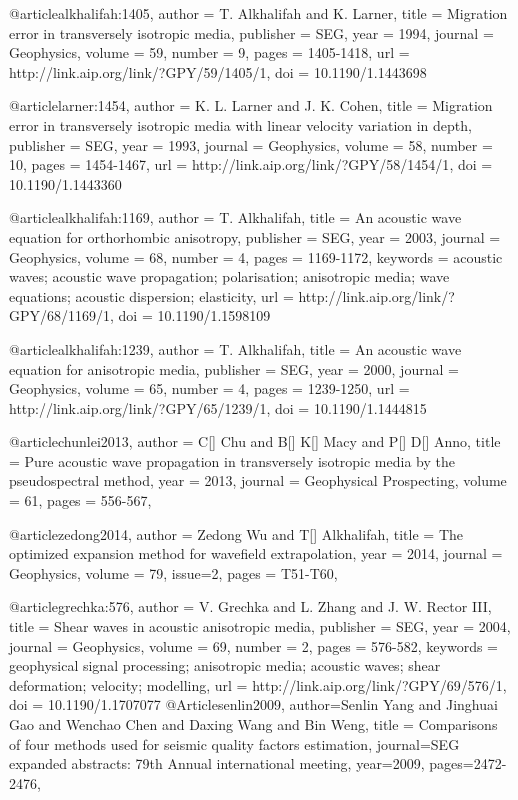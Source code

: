 {@article{alkhalifah:1405,
  author =	 {T. Alkhalifah and K. Larner},
  title =	 {Migration error in transversely isotropic media},
  publisher =	 {SEG},
  year =	 1994,
  journal =	 {Geophysics},
  volume =	 59,
  number =	 9,
  pages =	 {1405-1418},
  url =		 {http://link.aip.org/link/?GPY/59/1405/1},
  doi =		 {10.1190/1.1443698}
}

@article{larner:1454,
  author =	 {K. L. Larner and J. K. Cohen},
  title =	 {Migration error in transversely isotropic media with
                  linear velocity variation in depth},
  publisher =	 {SEG},
  year =	 1993,
  journal =	 {Geophysics},
  volume =	 58,
  number =	 10,
  pages =	 {1454-1467},
  url =		 {http://link.aip.org/link/?GPY/58/1454/1},
  doi =		 {10.1190/1.1443360}
}

@article{alkhalifah:1169,
  author =	 {T. Alkhalifah},
  title =	 {An acoustic wave equation for orthorhombic
                  anisotropy},
  publisher =	 {SEG},
  year =	 2003,
  journal =	 {Geophysics},
  volume =	 68,
  number =	 4,
  pages =	 {1169-1172},
  keywords =	 {acoustic waves; acoustic wave propagation;
                  polarisation; anisotropic media; wave equations;
                  acoustic dispersion; elasticity},
  url =		 {http://link.aip.org/link/?GPY/68/1169/1},
  doi =		 {10.1190/1.1598109}
}

@article{alkhalifah:1239,
  author =	 {T. Alkhalifah},
  title =	 {An acoustic wave equation for anisotropic media},
  publisher =	 {SEG},
  year =	 2000,
  journal =	 {Geophysics},
  volume =	 65,
  number =	 4,
  pages =	 {1239-1250},
  url =		 {http://link.aip.org/link/?GPY/65/1239/1},
  doi =		 {10.1190/1.1444815}
}

@article{chunlei2013,
  author =	 {C[] Chu and B[] K[] Macy and P[] D[] Anno},
  title =	 { Pure acoustic wave propagation in transversely isotropic media by the pseudospectral method},
  year =	 2013,
  journal =	 {Geophysical Prospecting},
  volume =	 61,
  pages =	 {556-567},
}

@article{zedong2014,
  author =	 {Zedong Wu and T[] Alkhalifah},
  title =	 {The optimized expansion method for wavefield extrapolation},
  year =	 2014,
  journal =	 {Geophysics},
  volume =	 79,
  issue=2,
  pages =	 {T51-T60},
}

@article{grechka:576,
  author =	 {V. Grechka and L. Zhang and J.
                  W. Rector III},
  title =	 {Shear waves in acoustic anisotropic media},
  publisher =	 {SEG},
  year =	 2004,
  journal =	 {Geophysics},
  volume =	 69,
  number =	 2,
  pages =	 {576-582},
  keywords =	 {geophysical signal processing; anisotropic media;
                  acoustic waves; shear deformation; velocity;
                  modelling},
  url =		 {http://link.aip.org/link/?GPY/69/576/1},
  doi =		 {10.1190/1.1707077}
}
@Article{senlin2009,
  author={Senlin Yang and Jinghuai Gao and Wenchao Chen and Daxing Wang and Bin Weng},
  title = {Comparisons of four methods used for seismic quality factors estimation},
  journal={SEG expanded abstracts: 79th Annual international meeting},
  year=2009,
  pages={2472-2476},
}

}
